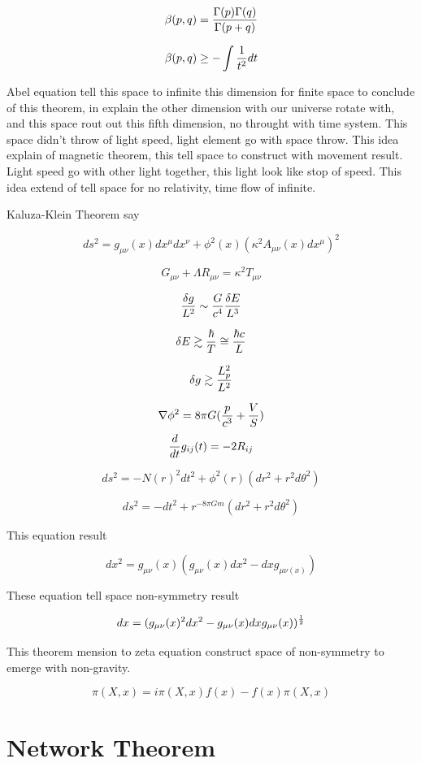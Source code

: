 \documentclass{jsarticle}
\begin{document}
  $$ \beta (p,q) = {\Gamma (p) \Gamma(q) \over \Gamma(p + q)} $$

  $$ \beta (p,q) \ge - \int {1 \over t^2}dt $$

  Abel equation tell this space to infinite this dimension for finite space to conclude of this theorem, 
in explain the other dimension with our universe rotate with, and this space rout out this fifth
dimension, no throught with time system. This space didn't throw of light speed, light element go with
space throw. This idea explain of magnetic theorem, this tell space to construct with movement result.
Light speed go with other light together, this light look like stop of speed. This idea extend
of tell space for no relativity, time flow of infinite.

  Kaluza-Klein Theorem say 

  $$ ds^2 = g_{\mu\nu} (x) dx^{\mu}dx^{\nu} + \phi^2 (x) (\kappa^2 A_{\mu\nu} (x) dx^{\mu})^2 $$

  $$ G_{\mu\nu} + \Lambda R_{\mu\nu} = \kappa^2 T_{\mu\nu} $$

  $$ {\delta g \over L^2} \sim {G \over c^4}{\delta E \over L^3} $$

  $$ \delta E \gtrsim {\hbar \over T} \cong {\hbar c \over L} $$

  $$ \delta g \gtrsim {L^2_{p} \over L^2} $$

  $$ \nabla \phi^2 = 8 \pi G({p \over c^3} + {V \over S}) $$
  $$ {d \over dt} g_{ij}(t) = - 2 R_{ij} $$

  $$ ds^2 = - N(r)^2dt^2 + \phi^2 (r)(dr^2 + r^2 d \theta^2) $$

  $$ ds^2 = -dt^2+ r^{-8 \pi G m} (dr^2 + r^2 d \theta^2) $$

  This equation result

  $$ dx^2 = g_{\mu\nu}(x)(g_{\mu\nu} (x)dx^2 - dxg_{\mu\nu (x)}) $$

  These equation tell space non-symmetry result

  $$ dx = (g_{\mu\nu} (x)^2 dx^2 - g_{\mu\nu} (x) dx g_{\mu\nu} (x))^{1 \over 2} $$

  This theorem mension to zeta equation construct space of non-symmetry to emerge with non-gravity.

  $$ \pi (X, x) = i \pi (X, x) f(x) - f(x) \pi (X, x) $$

  \section{Network Theorem}
\end{document}
